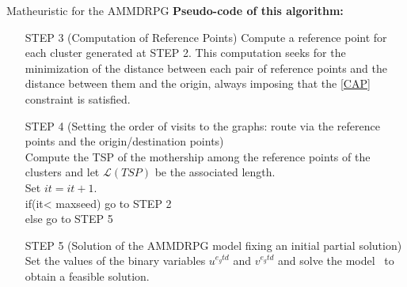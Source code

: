\documentclass[slidestop,usepdftitle=false,10pt]{beamer}
\begin{document}
    \begin{frame}{Matheuristic for the AMMDRPG}
    \textbf{Pseudo-code of this algorithm:}
    \begin{itemize}
        \small
        \item[STEP 3] (Computation of Reference Points) 
        Compute a reference point for each cluster generated at STEP 2. This computation seeks for the minimization of the distance between each pair of reference points and the distance between them and the origin, always imposing that the \eqref{CAP} constraint is satisfied.
        \item [STEP 4] (Setting the order of visits to the  graphs: route via the reference points and the origin/destination points) \\
        Compute the TSP of the mothership among the reference points of the clusters and let $\mathcal L(TSP)$ be the associated length.\\
        Set $it=it+1$.\\
        if(it< maxseed) go to STEP 2\\
        else go to STEP 5
        \item [STEP 5] (Solution of the AMMDRPG model fixing an initial partial solution)\\
        Set the values of the binary variables $u^{e_{g}td}$ and $v^{e_{g}td}$ and solve the model \AMD\, to obtain a feasible solution.
    \end{itemize}
	\end{frame}
	
\end{document}
